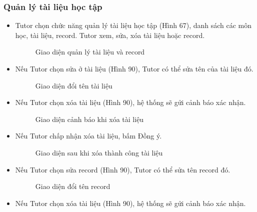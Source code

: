 \subsubsection*{Quản lý tài liệu học tập}
\begin{itemize}
    \item Tutor chọn chức năng quản lý tài liệu học tập (Hình 67), danh sách các môn học, tài liệu, record. Tutor xem, sửa, xóa tài liệu hoặc record.
    \begin{figure}[H]
    \centering
    \setlength{\fboxsep}{2pt}     
    \setlength{\fboxrule}{0.5pt}   
    \caption{Giao diện quản lý tài liệu và record}
    \end{figure}
    \item Nếu Tutor chọn sửa ở tài liệu (Hình 90), Tutor có thể sửa tên của tài liệu đó.
    \begin{figure}[H]
    \centering
    \setlength{\fboxsep}{2pt}     
    \setlength{\fboxrule}{0.5pt}   
    \caption{Giao diện đổi tên tài liệu}
    \end{figure}
    \item Nếu Tutor chọn xóa tài liệu (Hình 90), hệ thống sẽ gửi cảnh báo xác nhận.
    \begin{figure}[H]
    \centering
    \setlength{\fboxsep}{2pt}     
    \setlength{\fboxrule}{0.5pt}   
    \caption{Giao diện cảnh báo khi xóa tài liệu}
    \end{figure}
    \item Nếu Tutor chấp nhận xóa tài liệu, bấm Đồng ý. 
    \begin{figure}[H]
    \centering
    \setlength{\fboxsep}{2pt}     
    \setlength{\fboxrule}{0.5pt}   
    \caption{Giao diện sau khi xóa thành công tài liệu}
    \end{figure}
    \item Nếu Tutor chọn sửa record (Hình 90), Tutor có thể sửa tên record đó.
    \begin{figure}[H]
    \centering
    \setlength{\fboxsep}{2pt}     
    \setlength{\fboxrule}{0.5pt}   
    \caption{Giao diện đổi tên record}
    \end{figure}
    \item Nếu Tutor chọn xóa tài liệu (Hình 90), hệ thống sẽ gửi cảnh báo xác nhận.

\end{itemize}
